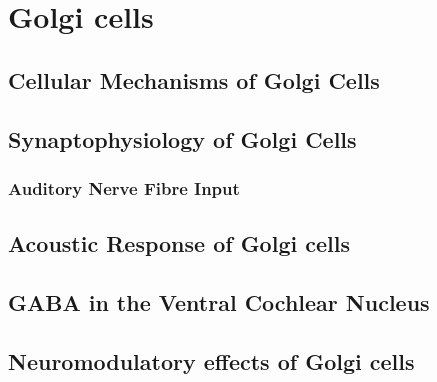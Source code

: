 
\section{Golgi cells}
    
\subsection{Cellular Mechanisms of Golgi Cells}

\subsection{Synaptophysiology of Golgi Cells}

\subsubsection{Auditory Nerve Fibre Input}



    
\subsection{Acoustic Response of Golgi cells}
    
\subsection{GABA in the Ventral Cochlear Nucleus}
    
\subsection{Neuromodulatory effects of Golgi cells}

